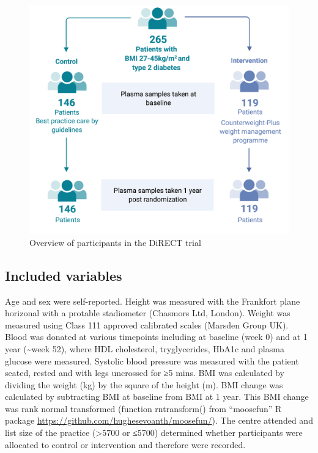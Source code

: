 \documentclass[11pt,twoside]{bristolthesis}
\begin{document}
\begin{figure}
\includegraphics{figure/DiRECT/DiRECT_study_summary} \caption[Overview of participants in the DiRECT trial]{Overview of participants in the DiRECT trial}\label{fig:direct-participants}
\end{figure}
\hypertarget{included-variables}{%
\subsection{Included variables}\label{included-variables}}

Age and sex were self-reported. Height was measured with the Frankfort plane horizonal with a protable stadiometer (Chasmors Ltd, London). Weight was measured using Class 111 approved calibrated scales (Marsden Group UK). Blood was donated at various timepoints including at baseline (week 0) and at 1 year (\textasciitilde week 52), where HDL cholesterol, tryglycerides, HbA1c and plasma glucose were measured. Systolic blood pressure was measured with the patient seated, rested and with legs uncrossed for ≥5 mins. BMI was calculated by dividing the weight (kg) by the square of the height (m). BMI change was calculated by subtracting BMI at baseline from BMI at 1 year. This BMI change was rank normal transformed (function rntransform() from ``moosefun'' R package \url{https://github.com/hughesevoanth/moosefun/}). The centre attended and list size of the practice (\textgreater5700 or ≤5700) determined whether participants were allocated to control or intervention and therefore were recorded.
\end{document}
